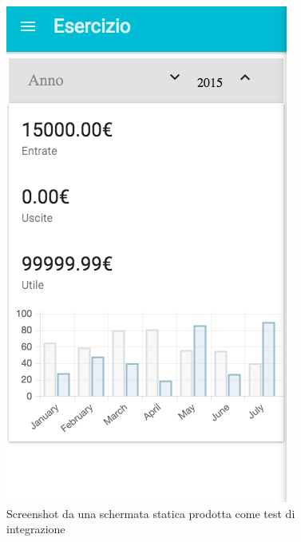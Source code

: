 \begin{figure}[H]\label{imgChartJS}
	\centering
	\includegraphics[width=.4\columnwidth]{images/chartjs.png}
	\caption{Screenshot da una schermata statica prodotta come test di integrazione}
\end{figure}

